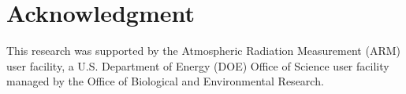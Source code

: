\documentclass[letterpaper, 10 pt, conference]{ieeeconf}  %
\begin{document}
\section*{Acknowledgment}
This research was supported by the Atmospheric Radiation Measurement (ARM) user 
facility, a U.S. Department of Energy (DOE) Office of Science user facility 
managed by the Office of Biological and Environmental Research.


 

\end{document}
